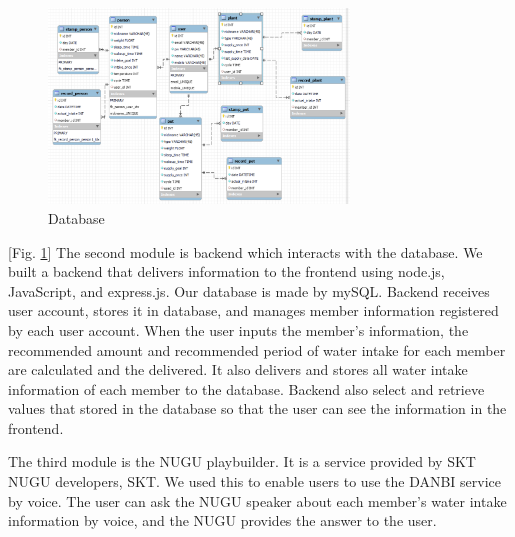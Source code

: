 \documentclass[conference]{IEEEtran}
\begin{document}
\par \begin{figure}[h!]
\includegraphics[width=8cm]{image/db.PNG}
\centering
\caption{Database}
\label{fig:db}
\end{figure}

[Fig. \ref{fig:db}] The second module is backend which interacts with the database. We built a backend that delivers information to the frontend using node.js, JavaScript, and express.js. Our database is made by mySQL. Backend receives user account, stores it in database, and manages member information registered by each user account. When the user inputs the member's information, the recommended amount and recommended period of water intake for each member are calculated and the delivered. It also delivers and stores all water intake information of each member to the database. Backend also select and retrieve values that stored in the database so that the user can see the information in the frontend.

The third module is the NUGU playbuilder. It is a service provided by SKT NUGU developers, SKT. We used this to enable users to use the DANBI service by voice. The user can ask the NUGU speaker about each member's water intake information by voice, and the NUGU provides the answer to the user.
\end{document}
